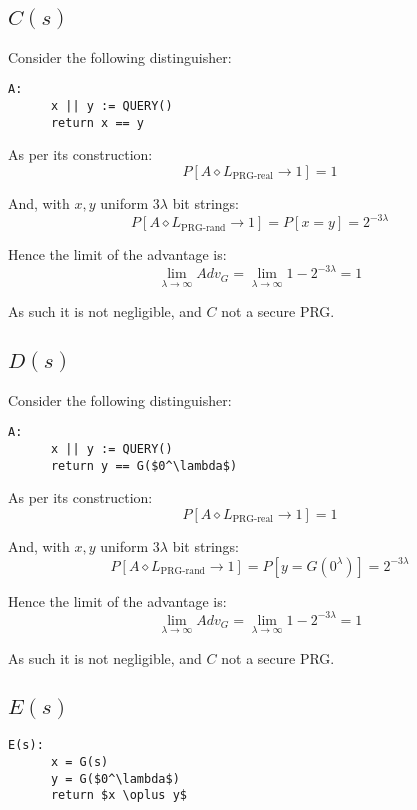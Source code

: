 \documentclass[a4paper]{scrreprt}
\begin{document}
\subsection{$C(s)$}

Consider the following distinguisher:
\begin{lstlisting}[mathescape=true, frame=single]
	A:
	  x || y := QUERY()
	  return x == y
\end{lstlisting}

As per its construction: 
\[
	P[A \diamond L_{\text{PRG-real}} \rightarrow 1] = 1
\]

And, with $x, y$ uniform $3 \lambda$ bit strings:
\[
	P[A \diamond L_{\text{PRG-rand}} \rightarrow 1] = P[x = y] = 2^{-3 \lambda}
\]

Hence the limit of the advantage is:
\[
	\lim_{\lambda \to \infty} Adv_G = \lim_{\lambda \to \infty} 1 - 2^{-3 \lambda} = 1
\]

As such it is not negligible, and $C$ not a secure PRG.

\subsection{$D(s)$}

Consider the following distinguisher:
\begin{lstlisting}[mathescape=true, frame=single]
	A:
	  x || y := QUERY()
	  return y == G($0^\lambda$)
\end{lstlisting}

As per its construction: 
\[
	P[A \diamond L_{\text{PRG-real}} \rightarrow 1] = 1
\]

And, with $x, y$ uniform $3 \lambda$ bit strings:
\[
	P[A \diamond L_{\text{PRG-rand}} \rightarrow 1] = P[y = G(0^\lambda)] = 2^{-3 \lambda}
\]

Hence the limit of the advantage is:
\[
	\lim_{\lambda \to \infty} Adv_G = \lim_{\lambda \to \infty} 1 - 2^{-3 \lambda} = 1
\]

As such it is not negligible, and $C$ not a secure PRG.

\subsection{$E(s)$}

\begin{lstlisting}[mathescape=true, frame=single]
	E(s):
	  x = G(s)
	  y = G($0^\lambda$)
	  return $x \oplus y$
\end{lstlisting}
\end{document}
